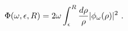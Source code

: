 \begin{equation}\label{2.23}
\Phi(\omega,\epsilon, R)=2\omega \int_\epsilon^R
{d \rho \over \rho} |\phi_\omega(\rho)|^2
~.
\end{equation}

